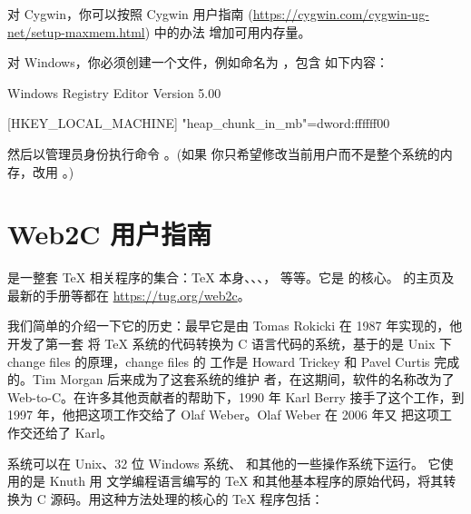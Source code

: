 \documentclass{article}
\begin{document}
对 Cygwin，你可以按照 Cygwin 用户指南
(\url{https://cygwin.com/cygwin-ug-net/setup-maxmem.html}) 中的办法
增加可用内存量。

对 Windows，你必须创建一个文件，例如命名为 ，包含
如下内容：

\begin{sverbatim}
  Windows Registry Editor Version 5.00

    [HKEY_LOCAL_MACHINE\Software\Cygwin]
  "heap_chunk_in_mb"=dword:ffffff00
\end{sverbatim}

\noindent 然后以管理员身份执行命令 。(如果
你只希望修改当前用户而不是整个系统的内存，改用 。)

\section{Web2C 用户指南}

\Webc{} 是一整套 \TeX{} 相关程序的集合：\TeX{} 本身、\MF{}、\MP{}、\BibTeX{}，
等等。它是 \TL{} 的核心。\Webc{} 的主页及最新的手册等都在
\url{https://tug.org/web2c}。

我们简单的介绍一下它的历史：最早它是由 Tomas Rokicki 在 1987 年实现的，他开发了第一套
将 \TeX{} 系统的代码转换为 C 语言代码的系统，基于的是 Unix 下 change files
的原理，change files 的
工作是 Howard Trickey 和 Pavel Curtis 完成的。Tim Morgan 后来成为了这套系统的维护
者，在这期间，软件的名称改为了 Web-to-C\@。在许多其他贡献者的帮助下，1990 年 Karl Berry
接手了这个工作，到 1997 年，他把这项工作交给了 Olaf Weber。Olaf Weber 在 2006 年又
把这项工作交还给了 Karl。

\Webc{} 系统可以在 Unix、32 位 Windows 系统、\MacOSX{} 和其他的一些操作系统下运行。
它使用的是 Knuth 用 \web{} 文学编程语言编写的 \TeX{} 和其他基本程序的原始代码，将其转换为 C
源码。用这种方法处理的核心的 \TeX{} 程序包括：
\end{document}
